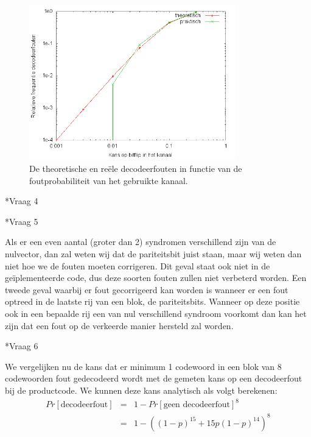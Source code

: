 \documentclass[]{article}
\begin{document}
\begin{section}
\begin{subsection}
        \begin{figure}[h]
            \centering
            \includegraphics[width=0.8\textwidth]{vraag2_3.png}
            \caption{De theoretische en re\"ele decodeerfouten in
                functie van de foutprobabiliteit van het gebruikte
            kanaal.}
            \label{fig:2_3}
        \end{figure}

    \end{subsection}

    \begin{subsection}*{Vraag 4} %
    \end{subsection}

    \begin{subsection}*{Vraag 5} %

        Als er een even aantal (groter dan 2) syndromen verschillend
        zijn van de nulvector, dan zal weten wij dat de pariteitsbit
        juist staan, maar wij weten dan niet hoe we de fouten moeten
        corrigeren. Dit geval staat ook niet in de ge\"iplementeerde
        code, dus deze soorten fouten zullen niet verbeterd worden.
        Een tweede geval waarbij er fout gecorrigeerd kan worden is
        wanneer er een fout optreed in de laatste rij van een blok, de
        pariteitsbits. Wanneer op deze positie ook in een bepaalde rij
        een van nul verschillend syndroom voorkomt dan kan het zijn
        dat een fout op de verkeerde manier hersteld zal worden.

    \end{subsection}

    \begin{subsection}*{Vraag 6} %

        We vergelijken nu de kans dat er minimum 1 codewoord in een
        blok van 8 codewoorden fout gedecodeerd wordt met de gemeten
        kans op een decodeerfout bij de productcode. We kunnen deze
        kans analytisch als volgt berekenen:
        \begin{eqnarray*}
            Pr[\text{decodeerfout}]
                &=& 1 - Pr[\text{geen decodeerfout}]^8 \\ 
                &=& 1 - ((1-p)^{15} + 15p(1-p)^{14})^8
        \end{eqnarray*}


\end{subsection}
\end{section}
\end{document}
